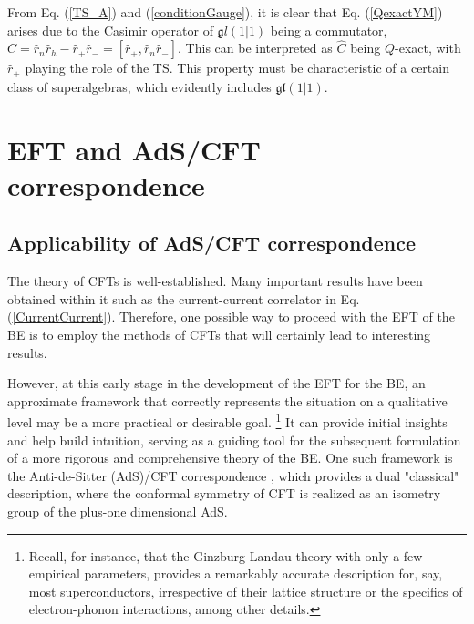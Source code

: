 \documentclass[final,5p,10pt,times,twocolumn,year]{elsarticle}
\begin{document}
From Eq. (\ref{TS_A}) and (\ref{conditionGauge}), it is clear that Eq. (\ref{QexactYM}) arises due to the Casimir operator of ${\mathfrak gl}(1|1)$ being a commutator, $\hat C = \hat r_n \hat r_h - \hat r_+ \hat r_- = [\hat r_+, \hat r_n \hat r_- ]$. This can be interpreted as $\hat C$ being $Q$-exact, with $\hat r_+$ playing the role of the TS. This property must be characteristic of a certain class of superalgebras, which evidently includes $\mathfrak{gl}(1|1)$.

\section{EFT and AdS/CFT correspondence}
\label{Sec:BF_AdSCFT}

\subsection{Applicability of AdS/CFT correspondence}

The theory of CFTs is well-established. Many important results have been obtained within it such as the current-current correlator in Eq.(\ref{CurrentCurrent}). Therefore, one possible way to proceed with the EFT of the BE is to employ the methods of CFTs that will certainly lead to interesting results. 

However, at this early stage in the development of the EFT for the BE, an approximate framework that correctly represents the situation on a qualitative level may be a more practical or desirable goal.
\footnote{Recall, for instance, that  the Ginzburg-Landau theory with only a few empirical parameters, provides a remarkably accurate description for, say, most superconductors, irrespective of their lattice structure or the specifics of electron-phonon interactions, among other details.}
It can provide initial insights and help build intuition, serving as a guiding tool for the subsequent formulation of a more rigorous and comprehensive theory of the BE. One such framework is the Anti-de-Sitter (AdS)/CFT correspondence \cite{AdSCFT_Maldacena,GUBSER1998105,Witten1998AntideSS,natsuume2016adscftdualityuserguide,Penedones_2016,KaplanAdSCFT}, which provides a dual "classical" description, where the conformal symmetry of CFT is realized as an isometry group of the plus-one dimensional AdS. 
\end{document}
